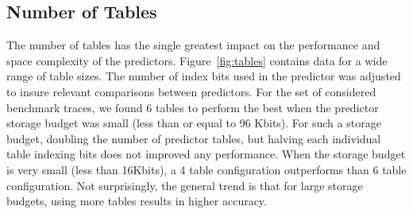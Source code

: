 \subsection{Number of Tables}
The number of tables has the single greatest impact on the performance and space complexity of the predictors.  Figure~\ref{fig:tables} contains data for a wide range of table sizes.  The number of index bits used in the predictor was adjusted to insure relevant comparisons between predictors.  For the set of considered benchmark traces, we found 6 tables to perform the best when the predictor storage budget was small (less than or equal to 96 Kbits).  For such a storage budget, doubling the number of predictor tables, but halving each individual table indexing bits does not improved any performance.  When the storage budget is very small (less than 16Kbits), a 4 table configuration outperforms than 6 table configuration.  Not surprisingly, the general trend is that for large storage budgets, using more tables results in higher accuracy.


